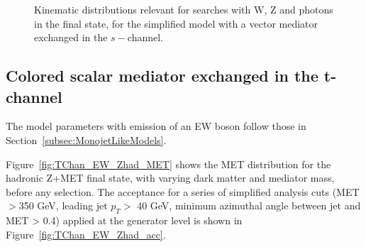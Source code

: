 \begin{figure}[h!]
{    }    
    \hfill
    \caption{Kinematic distributions relevant for searches with W, Z and photons in the final state, 
    for the simplified model with a vector mediator exchanged in the $s-$channel.}
    \label{fig:DMV_EW_kinematics}
\end{figure}

\subsection{Colored scalar mediator exchanged in the t-channel}

The model parameters with emission of an EW boson follow those in Section~\ref{subsec:MonojetLikeModels}.

Figure~\ref{fig:TChan_EW_Zhad_MET} shows the MET distribution for the hadronic Z+MET final state, 
with varying dark matter and mediator mass, before any selection. 
The acceptance for a series of simplified analysis cuts 
(MET$>$350 GeV, leading jet $p_T >$ 40 GeV, minimum azimuthal angle between jet and MET > 0.4) 
applied at the generator level is shown in Figure~\ref{fig:TChan_EW_Zhad_acc}. 

